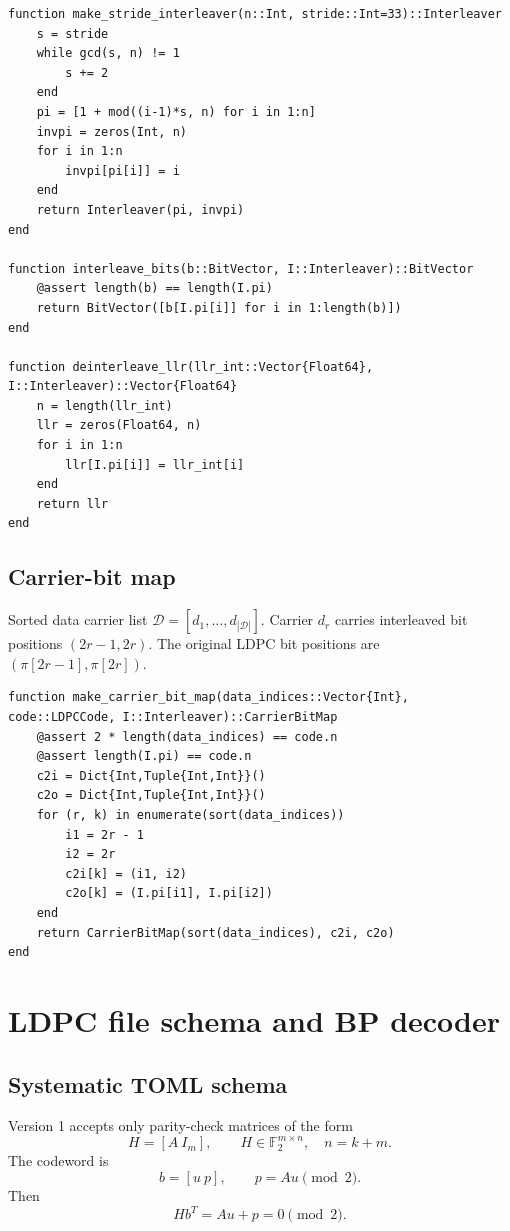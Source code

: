 \documentclass[11pt]{article}
\newcommand{\F}{\mathbb{F}}
\begin{document}
\begin{lstlisting}
function make_stride_interleaver(n::Int, stride::Int=33)::Interleaver
    s = stride
    while gcd(s, n) != 1
        s += 2
    end
    pi = [1 + mod((i-1)*s, n) for i in 1:n]
    invpi = zeros(Int, n)
    for i in 1:n
        invpi[pi[i]] = i
    end
    return Interleaver(pi, invpi)
end

function interleave_bits(b::BitVector, I::Interleaver)::BitVector
    @assert length(b) == length(I.pi)
    return BitVector([b[I.pi[i]] for i in 1:length(b)])
end

function deinterleave_llr(llr_int::Vector{Float64}, I::Interleaver)::Vector{Float64}
    n = length(llr_int)
    llr = zeros(Float64, n)
    for i in 1:n
        llr[I.pi[i]] = llr_int[i]
    end
    return llr
end
\end{lstlisting}

\subsection{Carrier-bit map}

Sorted data carrier list $\mathcal D=[d_1,\ldots,d_{|\mathcal D|}]$. Carrier $d_r$ carries interleaved bit positions $(2r-1,2r)$. The original LDPC bit positions are $(\pi[2r-1],\pi[2r])$.

\begin{lstlisting}
function make_carrier_bit_map(data_indices::Vector{Int}, code::LDPCCode, I::Interleaver)::CarrierBitMap
    @assert 2 * length(data_indices) == code.n
    @assert length(I.pi) == code.n
    c2i = Dict{Int,Tuple{Int,Int}}()
    c2o = Dict{Int,Tuple{Int,Int}}()
    for (r, k) in enumerate(sort(data_indices))
        i1 = 2r - 1
        i2 = 2r
        c2i[k] = (i1, i2)
        c2o[k] = (I.pi[i1], I.pi[i2])
    end
    return CarrierBitMap(sort(data_indices), c2i, c2o)
end
\end{lstlisting}

\clearpage
\section{LDPC file schema and BP decoder}

\subsection{Systematic TOML schema}

Version 1 accepts only parity-check matrices of the form
\begin{equation}
H=[A\ I_m],\qquad H\in\F_2^{m\times n},\quad n=k+m.
\end{equation}
The codeword is
\begin{equation}
b=[u\ p],\qquad p=A u\pmod 2.
\end{equation}
Then
\begin{equation}
Hb^T=A u+p=0\pmod2.
\end{equation}
\end{document}
